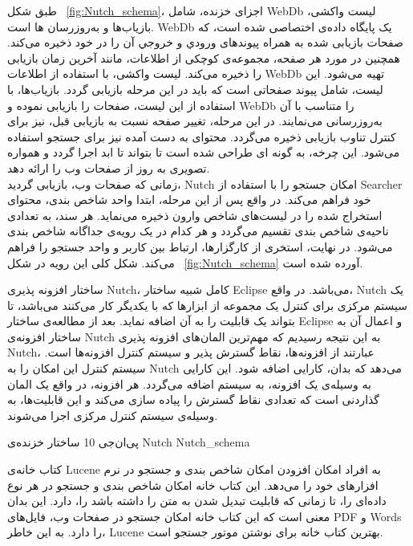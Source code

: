 طبق شکل ~\ref{fig:Nutch_schema}، اجزای خزنده، شامل WebDb لیست واکشی، بازیاب‌ها و به‌روزرسان ها است. WebDb یک پایگاه داده‌ی اختصاصی شده است، که صفحات بازیابی شده به همراه پیوند‌های ورودي و خروجي آن را در خود ذخیره می‌کند. همچنین در مورد هر صفحه، مجموعه‌ی کوچکی از اطلاعات، مانند آخرین زمان بازیابی را ذخیره می‌کند. لیست واکشی، با استفاده از اطلاعات WebDb تهیه می‌شود.  این لیست، شامل پیوند صفحاتی است که باید در این مرحله بازیابی گردد. بازیاب‌ها، با استفاده از  این لیست، صفحات را بازیابی نموده و WebDb را متناسب با آن به‌روزرسانی می‌نمایند. در این مرحله، تغییر صفحه نسبت به بازیابی قبل، نیز برای کنترل تناوب بازیابی ذخیره می‌گردد. محتوای به دست آمده نیز برای جستجو استفاده می‌شود. این چرخه، به گونه ای طراحی شده است تا بتواند تا ابد اجرا گردد و همواره تصویری به روز از صفحات وب را ارائه دهد.
\\
زمانی که صفحات وب، بازیابی گردید، Nutch امکان جستجو را با استفاده از Searcher خود فراهم می‌کند. در واقع پس از این مرحله، ابتدا واحد شاخص بندی، محتوای استخراج شده را در لیست‌های شاخص وارون ذخیره می‌نماید. هر سند، به تعدادی ناحیه‌ی شاخص بندی تقسیم می‌گردد و هر کدام در یک رویه‌ی جداگانه شاخص بندی می‌شود. در نهایت، استخری از کارگزارها، ارتباط بین کاربر و واحد جستجو را فراهم می‌کند. شکل کلی این رویه در شکل ~\ref{fig:Nutch_schema} آورده شده است.

ساختار افزونه پذیری Nutch، کامل شبیه ساختار Eclipse می‌باشد. در واقع، Nutch یک سیستم مرکزی برای کنترل یک مجموعه از ابزارها که با یکدیگر کار می‌کنند می‌باشد، تا بتواند یک قابليت را به آن اضافه نمايد. بعد از مطالعه‌ی ساختار Eclipse و اعمال آن به ساختار افزونه‌ی Nutch به این نتیجه رسیدیم که مهم‌ترین المان‌های افزونه پذیری Nutch، عبارتند از افزونه‌ها، نقاط گسترش پذیر و سیستم کنترل افزونه‌ها است. سیستم کنترل این امکان را به Nutch می‌دهد که بدان، کارایی اضافه شود. این کارایی به وسیله‌ی یک افزونه، به سیستم اضافه می‌گردد. هر افزونه، در واقع یک المان گذاردنی است که تعدادی نقاط گسترش را پیاده سازی می‌کند و این قابلیت‌ها، به وسیله‌ی سیستم کنترل مرکزی اجرا می‌شوند.

‌پی‌ان‌جی {10} {ساختار خزنده‌ی Nutch} {Nutch_schema}


کتاب خانه‌ی Lucene به افراد امکان افزودن امکان شاخص بندی و جستجو در نرم افزارهای خود را می‌دهد. این کتاب خانه امکان شاخص بندی و جستجو در هر نوع داده‌ای را، تا زمانی که قابلیت تبدیل شدن به متن را داشته باشد را، دارد. این بدان معنی است که این کتاب خانه امکان جستجو در صفحات وب، فایل‌های PDF و Words را دارد. به این خاطر، Lucene بهترین کتاب خانه برای نوشتن موتور جستجو است.

